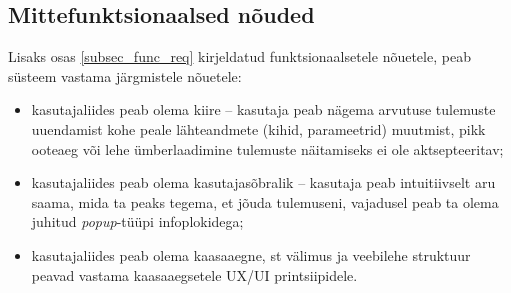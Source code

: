 \subsection{Mittefunktsionaalsed nõuded}
Lisaks osas \ref{subsec_func_req} kirjeldatud funktsionaalsetele nõuetele, peab süsteem vastama järgmistele nõuetele:
\begin{itemize}
    \item kasutajaliides peab olema kiire -- kasutaja peab nägema arvutuse tulemuste uuendamist kohe peale 
lähteandmete (kihid, parameetrid) muutmist, pikk ooteaeg või lehe ümberlaadimine tulemuste näitamiseks ei ole aktsepteeritav;
    \item kasutajaliides peab olema kasutajasõbralik -- kasutaja peab intuitiivselt aru saama, mida ta peaks tegema, et 
jõuda tulemuseni, vajadusel peab ta olema juhitud \textit{popup}-tüüpi infoplokidega;
    \item kasutajaliides peab olema kaasaaegne, st välimus ja veebilehe struktuur peavad
vastama kaasaaegsetele UX/UI printsiipidele.
\end{itemize}
